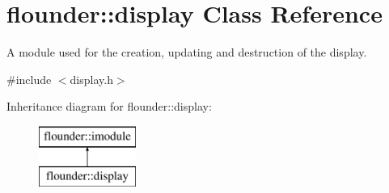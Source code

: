 \hypertarget{classflounder_1_1display}{}\section{flounder\+:\+:display Class Reference}
\label{classflounder_1_1display}


A module used for the creation, updating and destruction of the display.  




{\ttfamily \#include $<$display.\+h$>$}

Inheritance diagram for flounder\+:\+:display\+:\begin{figure}[H]
\begin{center}
\leavevmode
\includegraphics[height=2.000000cm]{classflounder_1_1display}
\end{center}
\end{figure}
